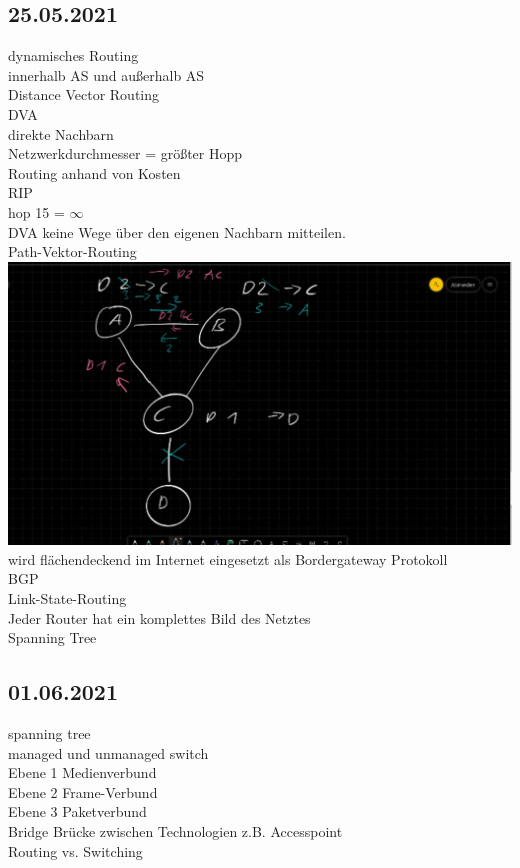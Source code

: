 \documentclass{article}
\begin{document}
	\subsection*{25.05.2021}
	dynamisches Routing \\
	innerhalb AS und außerhalb AS \\
	Distance Vector Routing \\
	DVA \\
	direkte Nachbarn \\
	Netzwerkdurchmesser = größter Hopp \\
	Routing anhand von Kosten \\
	RIP \\
	hop 15 = $\infty$ \\
	DVA keine Wege über den eigenen Nachbarn mitteilen. \\
	Path-Vektor-Routing \\
	\includegraphics[width=\linewidth]{samplePVR} \\
	wird flächendeckend im Internet eingesetzt als Bordergateway Protokoll \\
	BGP \\
	Link-State-Routing \\
	Jeder Router hat ein komplettes Bild des Netztes \\
	Spanning Tree \\
	\subsection*{01.06.2021}
	spanning tree \\
	managed und unmanaged switch \\
	Ebene 1 Medienverbund \\
	Ebene 2 Frame-Verbund \\
	Ebene 3 Paketverbund \\
	Bridge Brücke zwischen Technologien z.B. Accesspoint \\
	Routing vs. Switching \\
\end{document}
